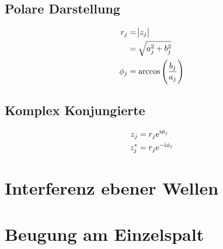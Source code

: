 \subsection{Polare Darstellung}

\begin{align*}
    r_j &= \abs{z_j} \\
        &= \sqrt{a_j^2 + b_j^2} \\
    \phi_j &= \darccos{\frac{b_j}{a_j}}
\end{align*}

\subsection{Komplex Konjungierte}

\begin{align*}
    z_j &= r_j\mathrm{e}^{\mathrm i\phi_j} \\
    z_j^* &= r_j\mathrm{e}^{-\mathrm i\phi_j}
\end{align*}

\section{Interferenz ebener Wellen}

\section{Beugung am Einzelspalt}


